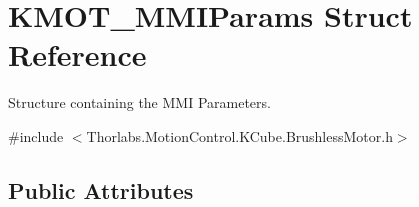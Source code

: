 \hypertarget{struct_k_m_o_t___m_m_i_params}{}\section{K\+M\+O\+T\+\_\+\+M\+M\+I\+Params Struct Reference}
\label{struct_k_m_o_t___m_m_i_params}


Structure containing the M\+MI Parameters.  




{\ttfamily \#include $<$Thorlabs.\+Motion\+Control.\+K\+Cube.\+Brushless\+Motor.\+h$>$}

\subsection*{Public Attributes}
